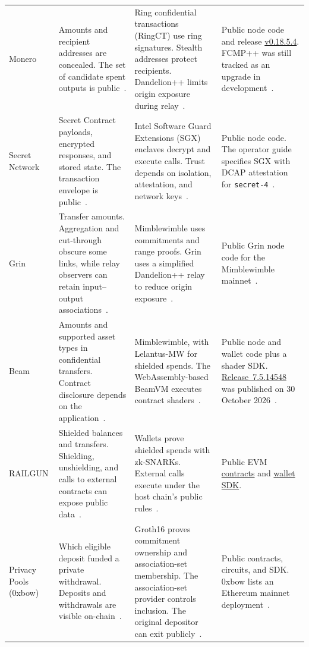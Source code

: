 \begin{longtable}{>{\raggedright\arraybackslash}m{}>{\raggedright\arraybackslash}m{}>{\raggedright\arraybackslash}m{}>{\raggedright\arraybackslash}m{}}
\addlinespace[3pt]
Monero & Amounts and recipient addresses are concealed. The set of candidate spent outputs is public~\cite{platform-monero}. & Ring confidential transactions (RingCT) use ring signatures. Stealth addresses protect recipients. Dandelion++ limits origin exposure during relay~\cite{platform-monero}. & Public node code and release \href{https://github.com/monero-project/monero}{v0.18.5.4}. FCMP++ was still tracked as an upgrade in development~\cite{platform-monero}. \\
\addlinespace[3pt]
Secret Network & Secret Contract payloads, encrypted responses, and stored state. The transaction envelope is public~\cite{platform-secret}. & Intel Software Guard Extensions (SGX) enclaves decrypt and execute calls. Trust depends on isolation, attestation, and network keys~\cite{platform-secret}. & Public node code. The operator guide specifies SGX with DCAP attestation for \texttt{secret-4}~\cite{platform-secret}. \\
\addlinespace[3pt]
Grin & Transfer amounts. Aggregation and cut-through obscure some links, while relay observers can retain input--output associations~\cite{platform-grin}. & Mimblewimble uses commitments and range proofs. Grin uses a simplified Dandelion++ relay to reduce origin exposure~\cite{platform-grin}. & Public Grin node code for the Mimblewimble mainnet~\cite{platform-grin}. \\
\addlinespace[3pt]
Beam & Amounts and supported asset types in confidential transfers. Contract disclosure depends on the application~\cite{platform-beam}. & Mimblewimble, with Lelantus-MW for shielded spends. The WebAssembly-based BeamVM executes contract shaders~\cite{platform-beam}. & Public node and wallet code plus a shader SDK. \href{https://github.com/BeamMW/beam}{Release~7.5.14548} was published on 30 October 2026~\cite{platform-beam}. \\
\addlinespace[3pt]
RAILGUN & Shielded balances and transfers. Shielding, unshielding, and calls to external contracts can expose public data~\cite{platform-railgun}. & Wallets prove shielded spends with zk-SNARKs. External calls execute under the host chain's public rules~\cite{platform-railgun}. & Public EVM \href{https://github.com/Railgun-Privacy/contract}{contracts} and \href{https://github.com/Railgun-Community/engine}{wallet SDK}. \\
\addlinespace[3pt]
Privacy Pools (0xbow) & Which eligible deposit funded a private withdrawal. Deposits and withdrawals are visible on-chain~\cite{platform-pools,platform-pools-paper2024}. & Groth16 proves commitment ownership and association-set membership. The association-set provider controls inclusion. The original depositor can exit publicly~\cite{platform-pools}. & Public contracts, circuits, and SDK. 0xbow lists an Ethereum mainnet deployment~\cite{platform-pools}. \\

\end{longtable}

